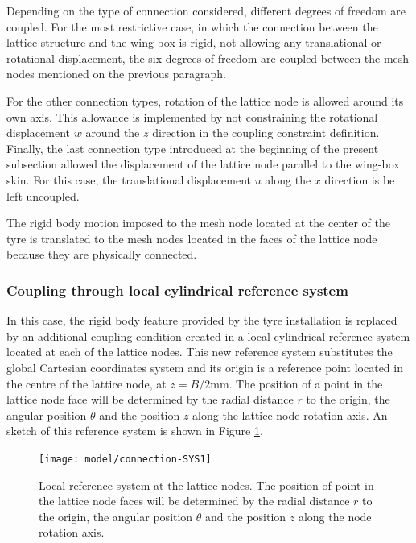     Depending on the type of connection considered, different degrees of freedom are coupled. For the most restrictive case, in which the connection between the lattice structure and the wing-box is rigid, not allowing any translational or rotational displacement, the six degrees of freedom are coupled between the mesh nodes mentioned on the previous paragraph.

    For the other connection types, rotation of the lattice node is allowed around its own axis. This allowance is implemented by not constraining the rotational displacement $w$ around the $z$ direction in the coupling constraint definition. Finally, the last connection type introduced at the beginning of the present subsection allowed the displacement of the lattice node parallel to the wing-box skin. For this case, the translational displacement $u$ along the $x$ direction is be left uncoupled.

    The rigid body motion imposed to the mesh node located at the center of the tyre is translated to the mesh nodes located in the faces of the lattice node because they are physically connected.

    \subsubsection{Coupling through local cylindrical reference system}

    In this case, the rigid body feature provided by the tyre installation is replaced by an additional coupling condition created in a local cylindrical reference system located at each of the lattice nodes. This new reference system substitutes the global Cartesian coordinates system and its origin is a reference point located in the centre of the lattice node,  at $z=B/2$mm. The position of a point in the lattice node face will be determined by the radial distance $r$ to the origin, the angular position $\theta$ and the position $z$ along the lattice node rotation axis. An sketch of this reference system is shown in Figure \ref{fig:connection-localSYS1}.

    \begin{figure}[!htpb]
      \centering
      \texttt{[image: model/connection-SYS1]}
      \caption[Local reference system at the lattice nodes]{Local reference system at the lattice nodes. The position of point in the lattice node faces will be determined by the radial distance $r$ to the origin, the angular position $\theta$ and the position $z$ along the node rotation axis.}\label{fig:connection-localSYS1}
    \end{figure}

